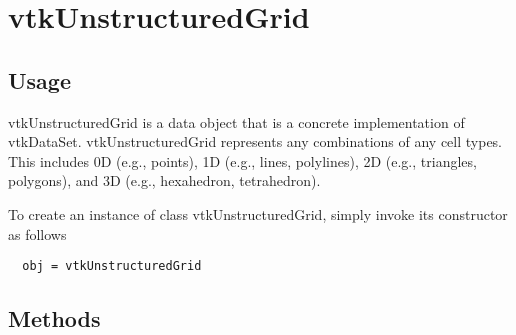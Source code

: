 \section{vtkUnstructuredGrid}

\subsection{Usage}

 vtkUnstructuredGrid is a data object that is a concrete implementation 
 of vtkDataSet. vtkUnstructuredGrid represents any combinations of any cell
 types. This includes 0D (e.g., points), 1D (e.g., lines, polylines), 2D 
 (e.g., triangles, polygons), and 3D (e.g., hexahedron, tetrahedron).

To create an instance of class vtkUnstructuredGrid, simply
invoke its constructor as follows
\begin{verbatim}
  obj = vtkUnstructuredGrid
\end{verbatim}
\subsection{Methods}

